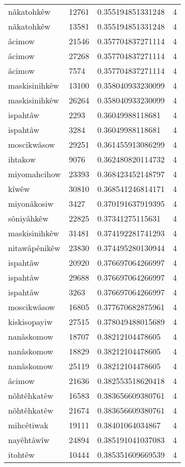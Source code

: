 \begin{longtable}{llll}
nâkatohkêw & 12761 & 0.355194851331248 & 4 \\
nâkatohkêw & 13581 & 0.355194851331248 & 4 \\
âcimow & 21546 & 0.357704837271114 & 4 \\
âcimow & 27268 & 0.357704837271114 & 4 \\
âcimow & 7574 & 0.357704837271114 & 4 \\
maskisinihkêw & 13100 & 0.358040933230099 & 4 \\
maskisinihkêw & 26264 & 0.358040933230099 & 4 \\
ispahtâw & 2293 & 0.36049988118681 & 4 \\
ispahtâw & 3284 & 0.36049988118681 & 4 \\
moscikwâsow & 29251 & 0.361455913086299 & 4 \\
ihtakow & 9076 & 0.362480820114732 & 4 \\
miyomahcihow & 23393 & 0.368423452148797 & 4 \\
kîwêw & 30810 & 0.368541246814171 & 4 \\
miyonâkosiw & 3427 & 0.370191637919395 & 4 \\
sôniyâhkêw & 22825 & 0.37341275115631 & 4 \\
maskisinihkêw & 31481 & 0.374192281741293 & 4 \\
nitawâpênikêw & 23830 & 0.374495280130944 & 4 \\
ispahtâw & 20920 & 0.376697064266997 & 4 \\
ispahtâw & 29688 & 0.376697064266997 & 4 \\
ispahtâw & 3263 & 0.376697064266997 & 4 \\
moscikwâsow & 16805 & 0.377670682875961 & 4 \\
kiskisopayiw & 27515 & 0.378049488015689 & 4 \\
nanâskomow & 18707 & 0.38212104478605 & 4 \\
nanâskomow & 18829 & 0.38212104478605 & 4 \\
nanâskomow & 25119 & 0.38212104478605 & 4 \\
âcimow & 21636 & 0.382553518620418 & 4 \\
nôhtêhkatêw & 16583 & 0.383656609380761 & 4 \\
nôhtêhkatêw & 21674 & 0.383656609380761 & 4 \\
mihcêtiwak & 19111 & 0.38401064034867 & 4 \\
nayêhtâwîw & 24894 & 0.385191041037083 & 4 \\
itohtêw & 10444 & 0.385351609669539 & 4 \\

\end{longtable}
